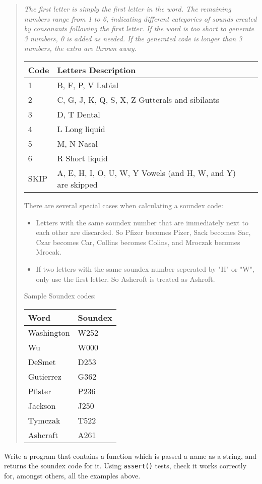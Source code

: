 \begin{quote}
{\it 
The first letter is simply the first letter in the word. The remaining numbers range from 1 to 6, indicating different categories of sounds created by consanants following the first letter. If the word is too short to generate 3 numbers, 0 is added as needed. If the generated code is longer than 3 numbers, the extra are thrown away.

\begin{center}
\begin{tabular}{|l|l|l|}\hline
Code& 	Letters	Description \\ \hline
1	& B, F, P, V	Labial \\ \hline
2	& C, G, J, K, Q, S, X, Z	Gutterals and sibilants \\ \hline
3	& D, T	Dental \\ \hline
4	& L	Long liquid \\ \hline
5	& M, N	Nasal \\ \hline
6	& R	Short liquid \\ \hline
SKIP	& A, E, H, I, O, U, W, Y	Vowels (and H, W, and Y) are skipped \\ \hline
\end{tabular}
\end{center}

There are several special cases when calculating a soundex code:

\begin{itemize}
\item Letters with the same soundex number that are immediately next to each other are discarded. So Pfizer becomes Pizer, Sack becomes Sac, Czar becomes Car, Collins becomes Colins, and Mroczak becomes Mrocak.
\item If two letters with the same soundex number seperated by "H" or "W", only use the first letter. So Ashcroft is treated as Ashroft.
\end{itemize}

Sample Soundex codes:

\begin{center}
\begin{tabular}{|l|l|} \hline
Word	 	& Soundex \\ \hline
Washington	& W252 \\ \hline
Wu	 	& W000 \\ \hline
DeSmet	 	& D253 \\ \hline
Gutierrez	& G362 \\ \hline
Pfister	 	& P236 \\ \hline
Jackson	 	& J250 \\ \hline
Tymczak	 	& T522 \\ \hline
Ashcraft	& A261 \\ \hline
\end{tabular}
\end{center}
}
\end{quote}

\begin{exercise}

Write a program that contains a function which is passed a name as a
string, and returns the soundex code for it.  Using \verb^assert()^ tests,
check it works correctly for, amongst others, all the examples above.

\end{exercise}

